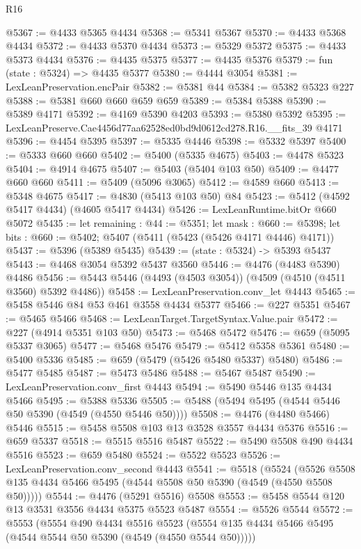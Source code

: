 \begin{lexlean}{R16}
\begin{coremodule}
@5367 := @4433 @5365 @4434
@5368 := @5341 @5367
@5370 := @4433 @5368 @4434
@5372 := @4433 @5370 @4434
@5373 := @5329 @5372
@5375 := @4433 @5373 @4434
@5376 := @4435 @5375
@5377 := @4435 @5376
@5379 := fun (state : @5324) => @4435 @5377
@5380 := @4444 @3054
@5381 := LexLeanPreservation.encPair
@5382 := @5381 @44
@5384 := @5382 @5323 @227
@5388 := @5381 @660 @660 @659 @659
@5389 := @5384 @5388
@5390 := @5389 @4171
@5392 := @4169 @5390 @4203
@5393 := @5380 @5392
@5395 := LexLeanPreserve.Cae4456d77aa62528ed0bd9d0612cd278.R16.__fits_39 @4171
@5396 := @4454 @5395
@5397 := @5335 @4446
@5398 := @5332 @5397
@5400 := @5333 @660 @660
@5402 := @5400 (@5335 @4675)
@5403 := @4478 @5323
@5404 := @4914 @4675
@5407 := @5403 (@5404 @103 @50)
@5409 := @4477 @660 @660
@5411 := @5409 (@5096 @3065)
@5412 := @4589 @660
@5413 := @5348 @4675
@5417 := @4830 (@5413 @103 @50) @84
@5423 := @5412 (@4592 @5417 @4434) (@4605 @5417 @4434)
@5426 := LexLeanRuntime.bitOr @660 @5072
@5435 := let remaining : @44 := @5351;
  let mask : @660 := @5398;
  let bits : @660 := @5402; @5407 (@5411 (@5423 (@5426 @4171 @4446) @4171))
@5437 := @5396 (@5389 @5435)
@5439 := (state : @5324) -> @5393 @5437
@5443 := @4468 @3054 @5392 @5437 @3560
@5446 := @4476 (@4483 @5390) @4486
@5456 := @5443 @5446 (@4493 (@4503 @3054)) (@4509 (@4510 (@4511 @3560) @5392 @4486))
@5458 := LexLeanPreservation.conv_let @4443
@5465 := @5458 @5446 @84 @53 @461 @3558 @4434 @5377
@5466 := @227 @5351
@5467 := @5465 @5466
@5468 := LexLeanTarget.TargetSyntax.Value.pair
@5472 := @227 (@4914 @5351 @103 @50)
@5473 := @5468 @5472
@5476 := @659 (@5095 @5337 @3065)
@5477 := @5468 @5476
@5479 := @5412 @5358 @5361
@5480 := @5400 @5336
@5485 := @659 (@5479 (@5426 @5480 @5337) @5480)
@5486 := @5477 @5485
@5487 := @5473 @5486
@5488 := @5467 @5487
@5490 := LexLeanPreservation.conv_first @4443
@5494 := @5490 @5446 @135 @4434 @5466
@5495 := @5388 @5336
@5505 := @5488 (@5494 @5495 (@4544 @5446 @50 @5390 (@4549 (@4550 @5446 @50))))
@5508 := @4476 (@4480 @5466) @5446
@5515 := @5458 @5508 @103 @13 @3528 @3557 @4434 @5376
@5516 := @659 @5337
@5518 := @5515 @5516 @5487
@5522 := @5490 @5508 @490 @4434 @5516
@5523 := @659 @5480
@5524 := @5522 @5523
@5526 := LexLeanPreservation.conv_second @4443
@5541 := @5518
    (@5524 (@5526 @5508 @135 @4434 @5466 @5495 (@4544 @5508 @50 @5390 (@4549 (@4550 @5508 @50)))))
@5544 := @4476 (@5291 @5516) @5508
@5553 := @5458 @5544 @120 @13 @3531 @3556 @4434 @5375 @5523 @5487
@5554 := @5526 @5544
@5572 := @5553
    (@5554
      @490
      @4434
      @5516
      @5523
      (@5554 @135 @4434 @5466 @5495 (@4544 @5544 @50 @5390 (@4549 (@4550 @5544 @50)))))

\end{coremodule}
\end{lexlean}
